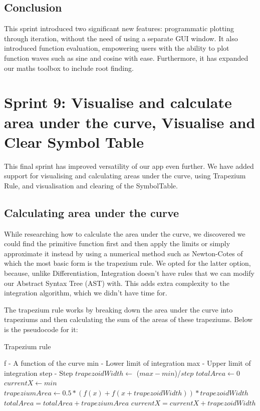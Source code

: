 \documentclass[a4paper, oneside, 11pt]{report}
\begin{document}
\subsection{Conclusion}
This sprint introduced two significant new features: programmatic plotting through iteration, without the need of using a separate GUI window. It also introduced function evaluation, empowering users with the ability to plot function waves such as sine and cosine with ease. Furthermore, it has expanded our maths toolbox to include root finding.

\section{Sprint 9: Visualise and calculate area under the curve, Visualise and Clear Symbol Table}
This final sprint has improved versatility of our app even further. We have added support for visualising and calculating areas under the curve, using Trapezium Rule, and visualisation and clearing of the SymbolTable.

\subsection{Calculating area under the curve}
While researching how to calculate the area under the curve, we discovered we could find the primitive function first and then apply the limits or simply approximate it instead by using a numerical method such as Newton-Cotes of which the most basic form is the trapezium rule. We opted for the latter option, because, unlike Differentiation, Integration doesn't have rules that we can modify our Abstract Syntax Tree (AST) with. This adds extra complexity to the integration algorithm, which we didn't have time for. 

The trapezium rule works by breaking down the area under the curve into trapeziums and then calculating the sum of the areas of these trapeziums. Below is the pseudocode for it:

\begin{algorithm}
\begin{algorithmic}[1]
\caption{Trapezium rule}
\label{algorithm-trapezium-rule}
\STATE f - A function of the curve
\STATE min - Lower limit of integration
\STATE max - Upper limit of integration
\STATE step - Step
\STATE $trapezoidWidth \gets$ ($max - min$)/$step$
\STATE $totalArea \gets 0$
\STATE $currentX \gets min$ 
    \STATE $trapeziumArea \gets 0.5 * (f(x) + f(x + trapezoidWidth)) * trapezoidWidth$
    \STATE $totalArea = totalArea + trapeziumArea$
    \STATE $currentX = currentX + trapezoidWidth$
\ENDWHILE
\end{algorithmic}
\end{algorithm}
\end{document}
